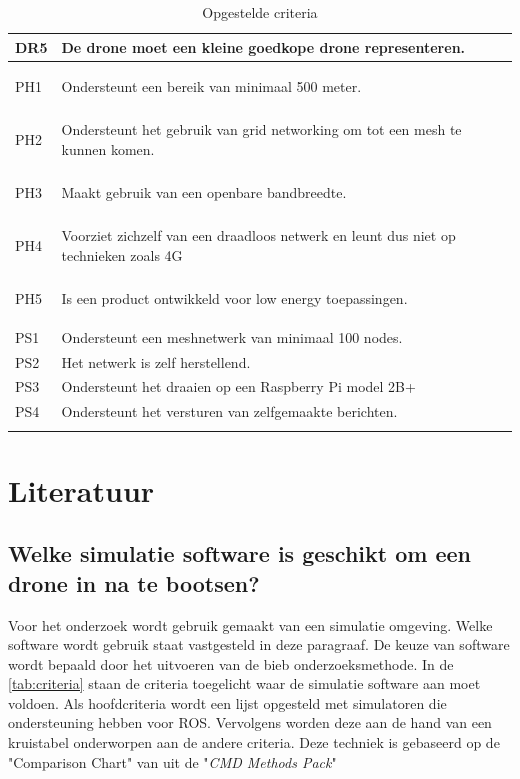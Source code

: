 \documentclass[a4paper, 11pt, oneside]{report}
\begin{document}
\begin{longtable}{|l|l|l|}
		DR5		& De drone moet een kleine goedkope drone representeren.        \\ \hline
		\hypertarget{ph1}{PH1}		& Ondersteunt een bereik van minimaal 500 meter.  \\ \hline
		\hypertarget{ph2}{PH2}		& Ondersteunt het gebruik van grid networking om tot een mesh te kunnen komen.  \\ \hline
		\hypertarget{ph3}{PH3}		& Maakt gebruik van een openbare bandbreedte.\\ \hline
		\hypertarget{ph4}{PH4}		& Voorziet zichzelf van een draadloos netwerk en leunt dus niet op technieken zoals 4G\\ \hline
		\hypertarget{ph5}{PH5}		& Is een product ontwikkeld voor low energy toepassingen. \\ \hline
		PS1		& Ondersteunt een meshnetwerk van minimaal 100 nodes. \\ \hline
		PS2		& Het netwerk is zelf herstellend. \\ \hline
		PS3		& Ondersteunt het draaien op een Raspberry Pi model 2B+ \\ \hline
		PS4		& Ondersteunt het versturen van zelfgemaakte berichten. \\ \hline
		
	\caption{Opgestelde criteria}
	\label{tab:criteria}
\end{longtable}

\chapter{Literatuur}


\section{Welke simulatie software is geschikt om een drone in na te bootsen?}
\label{sec:welkesim}
Voor het onderzoek wordt gebruik gemaakt van een simulatie omgeving.
Welke software wordt gebruik staat vastgesteld in deze paragraaf.
De keuze van software wordt bepaald door het uitvoeren van de bieb onderzoeksmethode. 
In de \autoref{tab:criteria} staan de criteria toegelicht waar de simulatie software aan moet voldoen.
Als hoofdcriteria wordt een lijst opgesteld met simulatoren die ondersteuning hebben voor ROS.
Vervolgens worden deze aan de hand van een kruistabel onderworpen aan de andere criteria.
Deze techniek is gebaseerd op de "Comparison Chart" van \cite{CMDmethod} uit de "\textit{CMD Methods Pack}"
\end{document}
